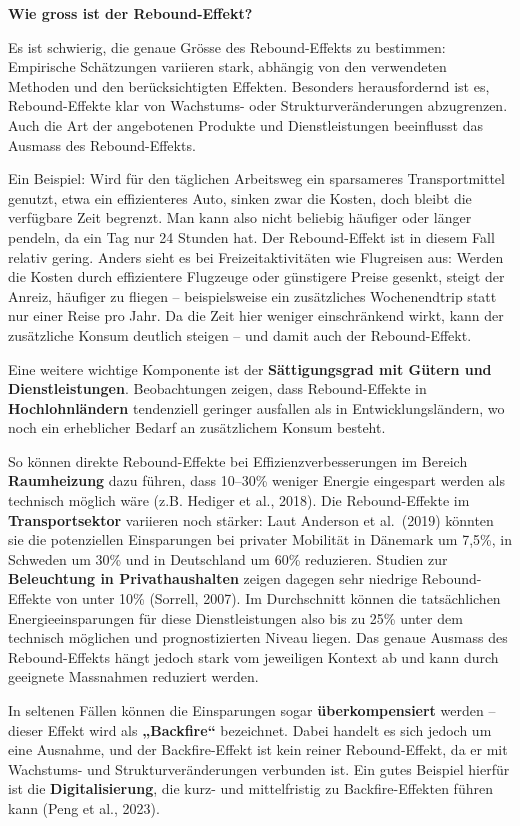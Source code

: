 \documentclass[
  letterpaper,
  DIV=11,
  numbers=noendperiod]{scrartcl}
\begin{document}
\textbf{Wie gross ist der Rebound-Effekt?}

Es ist schwierig, die genaue Grösse des Rebound-Effekts zu bestimmen:
Empirische Schätzungen variieren stark, abhängig von den verwendeten
Methoden und den berücksichtigten Effekten. Besonders herausfordernd ist
es, Rebound-Effekte klar von Wachstums- oder Strukturveränderungen
abzugrenzen. Auch die Art der angebotenen Produkte und Dienstleistungen
beeinflusst das Ausmass des Rebound-Effekts.

Ein Beispiel: Wird für den täglichen Arbeitsweg ein sparsameres
Transportmittel genutzt, etwa ein effizienteres Auto, sinken zwar die
Kosten, doch bleibt die verfügbare Zeit begrenzt. Man kann also nicht
beliebig häufiger oder länger pendeln, da ein Tag nur 24 Stunden hat.
Der Rebound-Effekt ist in diesem Fall relativ gering. Anders sieht es
bei Freizeitaktivitäten wie Flugreisen aus: Werden die Kosten durch
effizientere Flugzeuge oder günstigere Preise gesenkt, steigt der
Anreiz, häufiger zu fliegen -- beispielsweise ein zusätzliches
Wochenendtrip statt nur einer Reise pro Jahr. Da die Zeit hier weniger
einschränkend wirkt, kann der zusätzliche Konsum deutlich steigen -- und
damit auch der Rebound-Effekt.

Eine weitere wichtige Komponente ist der \textbf{Sättigungsgrad mit
Gütern und Dienstleistungen}. Beobachtungen zeigen, dass Rebound-Effekte
in \textbf{Hochlohnländern} tendenziell geringer ausfallen als in
Entwicklungsländern, wo noch ein erheblicher Bedarf an zusätzlichem
Konsum besteht.

So können direkte Rebound-Effekte bei Effizienzverbesserungen im Bereich
\textbf{Raumheizung} dazu führen, dass 10--30\% weniger Energie
eingespart werden als technisch möglich wäre (z.B. Hediger et al.,
2018). Die Rebound-Effekte im \textbf{Transportsektor} variieren noch
stärker: Laut Anderson et al.~(2019) könnten sie die potenziellen
Einsparungen bei privater Mobilität in Dänemark um 7,5\%, in Schweden um
30\% und in Deutschland um 60\% reduzieren. Studien zur
\textbf{Beleuchtung in Privathaushalten} zeigen dagegen sehr niedrige
Rebound-Effekte von unter 10\% (Sorrell, 2007). Im Durchschnitt können
die tatsächlichen Energieeinsparungen für diese Dienstleistungen also
bis zu 25\% unter dem technisch möglichen und prognostizierten Niveau
liegen. Das genaue Ausmass des Rebound-Effekts hängt jedoch stark vom
jeweiligen Kontext ab und kann durch geeignete Massnahmen reduziert
werden.

In seltenen Fällen können die Einsparungen sogar
\textbf{überkompensiert} werden -- dieser Effekt wird als
\textbf{„Backfire``} bezeichnet. Dabei handelt es sich jedoch um eine
Ausnahme, und der Backfire-Effekt ist kein reiner Rebound-Effekt, da er
mit Wachstums- und Strukturveränderungen verbunden ist. Ein gutes
Beispiel hierfür ist die \textbf{Digitalisierung}, die kurz- und
mittelfristig zu Backfire-Effekten führen kann (Peng et al., 2023).
\end{document}
